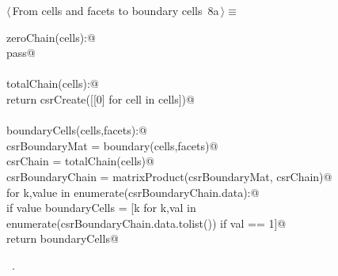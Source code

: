 \documentclass[11pt,oneside]{article}	%
\begin{document}
\begin{flushleft} \small
\begin{minipage}{\linewidth} \label{scrap19}
\protect{}$\langle\,$From cells and facets to boundary cells\nobreak\ {\footnotesize 8a}$\,\rangle\equiv$
\vspace{-1ex}
\begin{list}{}{} \item
\mbox{}\verb@def zeroChain(cells):@\\
\mbox{}\verb@   pass@\\
\mbox{}\verb@@\\
\mbox{}\verb@def totalChain(cells):@\\
\mbox{}\verb@   return csrCreate([[0] for cell in cells])@\\
\mbox{}\verb@@\\
\mbox{}\verb@def boundaryCells(cells,facets):@\\
\mbox{}\verb@   csrBoundaryMat = boundary(cells,facets)@\\
\mbox{}\verb@   csrChain = totalChain(cells)@\\
\mbox{}\verb@   csrBoundaryChain = matrixProduct(csrBoundaryMat, csrChain)@\\
\mbox{}\verb@   for k,value in enumerate(csrBoundaryChain.data):@\\
\mbox{}\verb@      if value % 2 == 0: csrBoundaryChain.data[k] = 0@\\
\mbox{}\verb@   boundaryCells = [k for k,val in enumerate(csrBoundaryChain.data.tolist()) if val == 1]@\\
\mbox{}\verb@   return boundaryCells@\\
\mbox{}\verb@@{\NWsep}
\end{list}
\vspace{-1ex}
\footnotesize\addtolength{\baselineskip}{-1ex}
\begin{list}{}{\setlength{\itemsep}{-\parsep}\setlength{\itemindent}{-\leftmargin}}
\item \NWtxtMacroRefIn\ .
\end{list}
\end{minipage}\\[4ex]
\end{flushleft}
\end{document}
